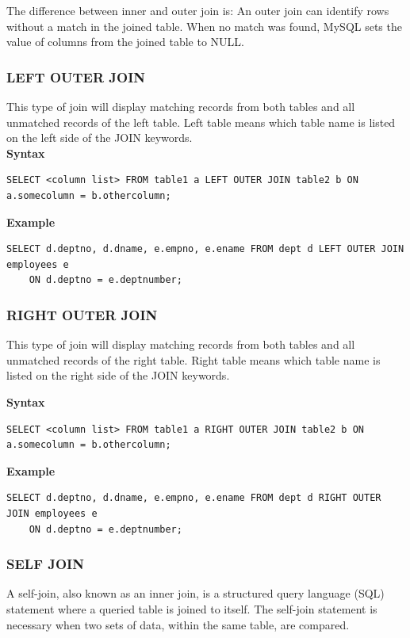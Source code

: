 \documentclass[11pt,a4paper]{article}
\begin{document}
The difference between inner and outer join is: An outer join can identify rows without a match in the joined table. When no match was found, MySQL sets the value of
columns from the joined table to NULL.\\

\subsubsection*{LEFT OUTER JOIN} This type of join will display matching records from both tables and all unmatched records of the left table. Left table means which table name is listed on the left side of the JOIN keywords.\\

\textbf{Syntax}
\begin{verbatim}
SELECT <column list> FROM table1 a LEFT OUTER JOIN table2 b ON a.somecolumn = b.othercolumn;\end{verbatim}

\textbf{Example}
\begin{verbatim}
SELECT d.deptno, d.dname, e.empno, e.ename FROM dept d LEFT OUTER JOIN employees e 
    ON d.deptno = e.deptnumber;\end{verbatim}

\subsubsection*{RIGHT OUTER JOIN} This type of join will display matching records from both tables and all unmatched
records of the right table. Right table means which table name is listed on the right side of the JOIN keywords.

\textbf{Syntax}
\begin{verbatim}SELECT <column list> FROM table1 a RIGHT OUTER JOIN table2 b ON a.somecolumn = b.othercolumn;\end{verbatim}

\textbf{Example}
\begin{verbatim}
SELECT d.deptno, d.dname, e.empno, e.ename FROM dept d RIGHT OUTER JOIN employees e 
    ON d.deptno = e.deptnumber;\end{verbatim}

\subsubsection*{SELF JOIN} A self-join, also known as an inner join, is a structured query language (SQL) statement where a queried table is joined to itself. The self-join statement is necessary when two sets of data, within the same table, are compared.
\end{document}
